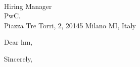 \documentclass[10pt,letter]{letter}
\begin{document}
\begin{letter}{\hm \\ Hiring Manager \\ PwC. \\ Piazza Tre Torri, 2, 20145 Milano MI, Italy }

\opening{Dear hm,}

\setlength\parindent{.5in}



 

\closing{Sincerely,}
\end{letter}
\end{document}
